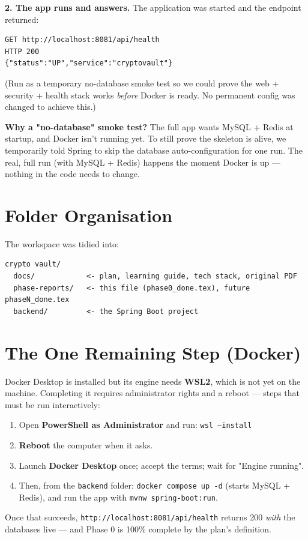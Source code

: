 \documentclass[11pt,a4paper]{article}
\newcommand{\code}[1]{\texttt{#1}}
\begin{document}
\begin{done}
\textbf{2. The app runs and answers.} The application was started and the endpoint returned:
\begin{lstlisting}
GET http://localhost:8081/api/health
HTTP 200
{"status":"UP","service":"cryptovault"}
\end{lstlisting}
(Run as a temporary no-database smoke test so we could prove the web + security + health stack
works \emph{before} Docker is ready. No permanent config was changed to achieve this.)
\end{done}

\begin{note}
\textbf{Why a "no-database" smoke test?} The full app wants MySQL + Redis at startup, and Docker
isn't running yet. To still prove the skeleton is alive, we temporarily told Spring to skip the
database auto-configuration for one run. The real, full run (with MySQL + Redis) happens the moment
Docker is up --- nothing in the code needs to change.
\end{note}

\section{Folder Organisation}
The workspace was tidied into:
\begin{lstlisting}
crypto vault/
  docs/            <- plan, learning guide, tech stack, original PDF
  phase-reports/   <- this file (phase0_done.tex), future phaseN_done.tex
  backend/         <- the Spring Boot project
\end{lstlisting}

\section{The One Remaining Step (Docker)}
\begin{todo}
Docker Desktop is installed but its engine needs \textbf{WSL2}, which is not yet on the machine.
Completing it requires administrator rights and a reboot --- steps that must be run interactively:
\begin{enumerate}[leftmargin=*]
  \item Open \textbf{PowerShell as Administrator} and run: \code{wsl --install}
  \item \textbf{Reboot} the computer when it asks.
  \item Launch \textbf{Docker Desktop} once; accept the terms; wait for "Engine running".
  \item Then, from the \code{backend} folder: \code{docker compose up -d}
        (starts MySQL + Redis), and run the app with \code{mvnw spring-boot:run}.
\end{enumerate}
Once that succeeds, \code{http://localhost:8081/api/health} returns 200 \emph{with} the databases
live --- and Phase 0 is 100\% complete by the plan's definition.
\end{todo}
\end{document}
